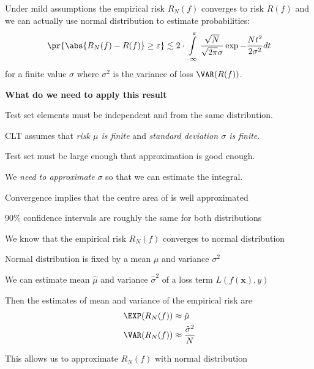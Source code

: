\documentclass[landscape,footrule]{foils}
\renewcommand{\vec}[1]{\boldsymbol{#1}}
\begin{document}





Under mild assumptions the empirical risk $R_N(f)$ converges to risk $R(f)$ and we can actually use normal distribution to estimate probabilities:
\begin{align*}
\pr{\abs{R_N(f)-R(f)}\geq \varepsilon} \lesssim 2\cdot \int\limits_{-\infty}^\varepsilon\frac{\sqrt{N}}{\sqrt{2\pi}\sigma}\exp{-\frac{N t^2}{2 \sigma^2}}dt
\end{align*}
for a finite value $\sigma$ where $\sigma^2$ is the variance of loss $\VAR(R(f))$.
\vspace*{0cm}

\textbf{What do we need to apply this result}
\begin{triangles}
\item Test set elements must be independent and from the same distribution. 
\item CLT assumes that \emph{risk $\mu$ is finite} and \emph{standard deviation $\sigma$ is finite}.
\item Test set must be large enough that approximation is good enough.
\item We \emph{need to approximate} $\sigma$\vspace*{-1ex} so that we can estimate the integral.
\end{triangles}




\vspace*{-0.5cm}

Convergence implies that the centre area of is well approximated 
\begin{triangles}
\item 90\% confidence intervals are roughly the same for both distributions
\end{triangles}



We know that the empirical risk $R_N(f)$ converges to normal distribution
\begin{triangles}
\item Normal distribution is fixed by a mean $\mu$ and variance $\sigma^2$
\item We can estimate mean $\hat{\mu}$ and variance $\hat{\sigma}^2$ of a loss term $L(f(\vec{x}), y)$ 
\item Then the estimates of mean and variance of the empirical risk are
\begin{align*}
\EXP(R_N(f))&\approx \hat{\mu}\\
\VAR(R_N(f))&\approx \frac{\hat{\sigma}^2}{N}
\end{align*}
\item This allows us to approximate $R_N(f)$ with normal distribution 
\end{triangles}
\end{document}
